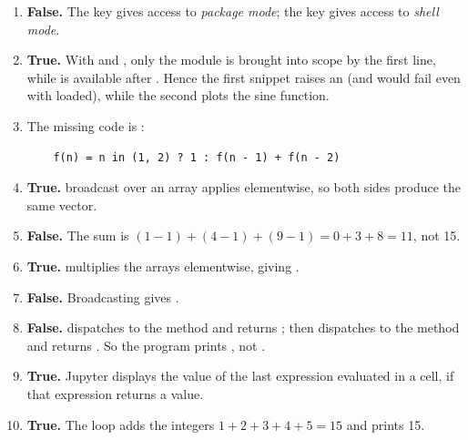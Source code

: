 \documentclass[a4paper]{article}
\begin{document}
\begin{enumerate}[itemsep=8pt]
    \item \textbf{False.}
        The key \julia{]} gives access to \emph{package mode};
        the key \julia{;} gives access to \emph{shell mode}.

    \item \textbf{True.}
        With  and , only the module
         is brought into scope by the first line, while
         is available after .
        Hence the first snippet raises an 
        (and  would fail even with 
        loaded), while the second plots the sine function.

    \item
        The missing code is :
        \begin{verbatim}
    f(n) = n in (1, 2) ? 1 : f(n - 1) + f(n - 2)
        \end{verbatim}

    \item \textbf{True.}
         broadcast over an array applies 
        elementwise, so both sides produce the same vector.

    \item \textbf{False.}
        The sum is $(1-1) + (4-1) + (9-1) = 0 + 3 + 8 = 11$, not 15.

    \item \textbf{True.}
         multiplies the arrays elementwise, giving
        \julia{[1*1, 2*2, 3*3] = [1, 4, 9]}.

    \item \textbf{False.}
        Broadcasting gives
        .

    \item \textbf{False.}
         dispatches to the  method and returns
        ;  then dispatches to the 
        method and returns .
        So the program prints , not .

    \item \textbf{True.}
        Jupyter displays the value of the last expression evaluated in a
        cell, if that expression returns a value.

    \item \textbf{True.}
        The loop adds the integers $1 + 2 + 3 + 4 + 5 = 15$ and prints 15.


\end{enumerate}
\end{document}
